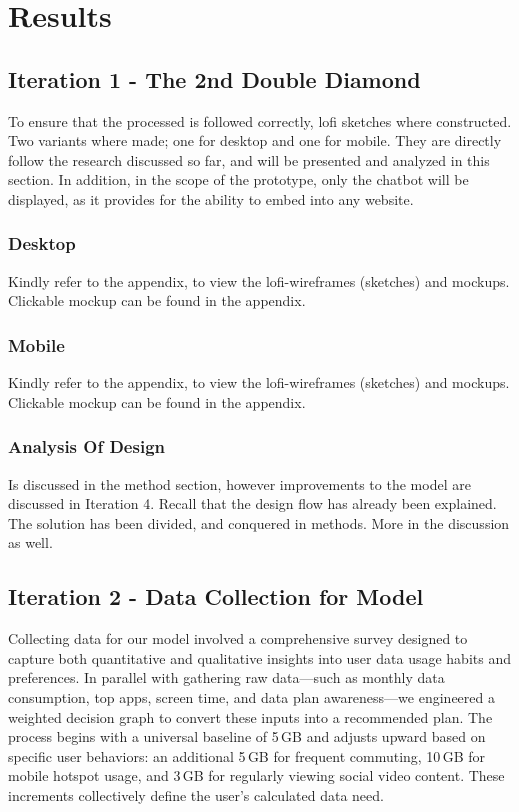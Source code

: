 \documentclass[conference]{IEEEtran}
\begin{document}
\section{Results}
\subsection{Iteration 1 - The 2nd Double Diamond}
To ensure that the processed is followed correctly, lofi sketches where constructed. Two variants where made; one for desktop and one for mobile. They are directly follow the research discussed so far, and will be presented and analyzed in this section. In addition, in the scope of the prototype, only the chatbot will be displayed, as it provides for the ability to embed into any website. 
\subsubsection{Desktop}
Kindly refer to the appendix, to view the lofi-wireframes (sketches) and mockups. Clickable mockup can be found in the appendix.\\


\subsubsection{Mobile}
Kindly refer to the appendix, to view the lofi-wireframes (sketches) and mockups. Clickable mockup can be found in the appendix.\\

\subsubsection{Analysis Of Design}
Is discussed in the method section, however improvements to the model are discussed in Iteration 4. Recall that the design flow has already been explained. The solution has been divided, and conquered in methods. More in the discussion as well.

\subsection{Iteration 2 - Data Collection for Model}

Collecting data for our model involved a comprehensive survey designed to capture both quantitative and qualitative insights into user data usage habits and preferences. In parallel with gathering raw data—such as monthly data consumption, top apps, screen time, and data plan awareness—we engineered a weighted decision graph to convert these inputs into a recommended plan. The process begins with a universal baseline of 5\,GB and adjusts upward based on specific user behaviors: an additional 5\,GB for frequent commuting, 10\,GB for mobile hotspot usage, and 3\,GB for regularly viewing social video content. These increments collectively define the user’s calculated data need.
\end{document}
